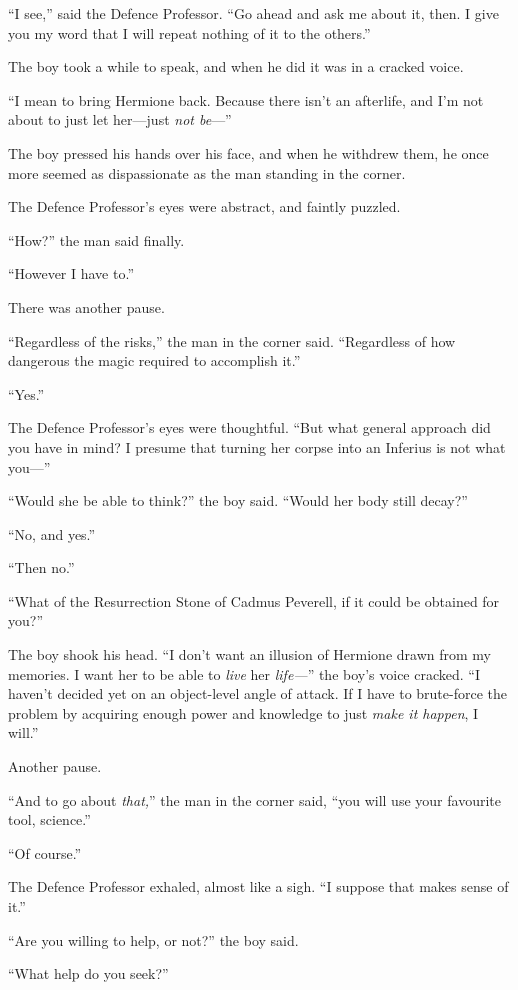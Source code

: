 “I see,” said the Defence Professor. “Go ahead and ask me about it, then. I give you my word that I will repeat nothing of it to the others.”

The boy took a while to speak, and when he did it was in a cracked voice.

“I mean to bring Hermione back. Because there isn’t an afterlife, and I’m not about to just let her—just \emph{not be}—”

The boy pressed his hands over his face, and when he withdrew them, he once more seemed as dispassionate as the man standing in the corner.

The Defence Professor’s eyes were abstract, and faintly puzzled.

“How?” the man said finally.

“However I have to.”

There was another pause.

“Regardless of the risks,” the man in the corner said. “Regardless of how dangerous the magic required to accomplish it.”

“Yes.”

The Defence Professor’s eyes were thoughtful. “But what general approach did you have in mind? I presume that turning her corpse into an Inferius is not what you—”

“Would she be able to think?” the boy said. “Would her body still decay?”

“No, and yes.”

“Then no.”

“What of the Resurrection Stone of Cadmus Peverell, if it could be obtained for you?”

The boy shook his head. “I don’t want an illusion of Hermione drawn from my memories. I want her to be able to \emph{live} her \emph{life—}” the boy’s voice cracked. “I haven’t decided yet on an object-level angle of attack. If I have to brute-force the problem by acquiring enough power and knowledge to just \emph{make it happen}, I will.”

Another pause.

“And to go about \emph{that,}” the man in the corner said, “you will use your favourite tool, science.”

“Of course.”

The Defence Professor exhaled, almost like a sigh. “I suppose that makes sense of it.”

“Are you willing to help, or not?” the boy said.

“What help do you seek?”

